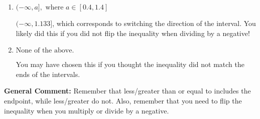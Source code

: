 \documentclass{extbook}[14pt]
\begin{document}
\begin{enumerate}
{\begin{enumerate}[label=\Alph*.]
* $[1.133, \infty)$, which is the correct option.
\item \( (-\infty, a], \text{ where } a \in [0.4, 1.4] \)

 $(-\infty, 1.133]$, which corresponds to switching the direction of the interval. You likely did this if you did not flip the inequality when dividing by a negative!
\item \( \text{None of the above}. \)

You may have chosen this if you thought the inequality did not match the ends of the intervals.
\end{enumerate}

\textbf{General Comment:} Remember that less/greater than or equal to includes the endpoint, while less/greater do not. Also, remember that you need to flip the inequality when you multiply or divide by a negative.
}
\end{enumerate}
\end{document}

